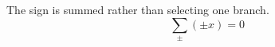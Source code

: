 \documentclass{article}
\begin{document}
The sign is summed rather than selecting one branch.
\begin{equation}
  \sum_{\pm} (\pm x) = 0
\end{equation}
\end{document}
